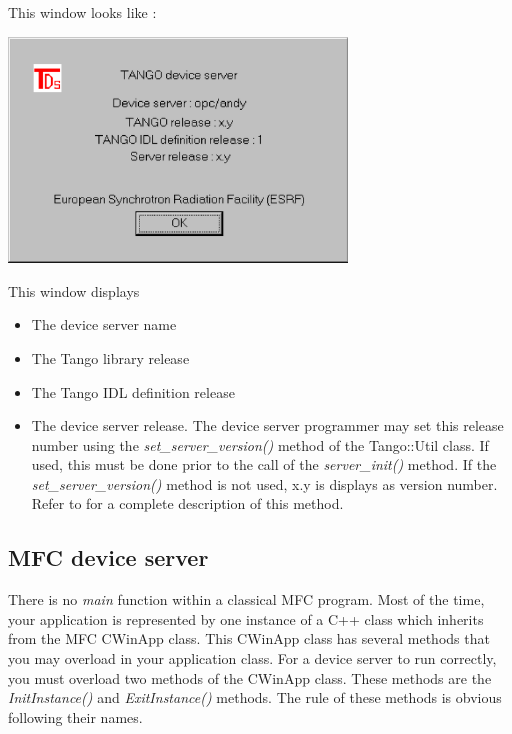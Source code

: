 This window looks like :

\vspace{0.3cm}

\begin{center}
\includegraphics[width=9cm]{ds_writing/nt_server/help}
\par\end{center}

\vspace{0.3cm}

This window displays 
\begin{itemize}
\item The device server name
\item The Tango library release
\item The Tango IDL definition release
\item The device server release. The device server programmer may set this
release number using the \emph{set\_server\_version()}
method of the Tango::Util class. If used, this must be
done prior to the call of the \emph{server\_init()} method. If the
\emph{set\_server\_version()} method is not used, x.y is displays
as version number. Refer to \cite{TANGO_ref_man} for a complete description
of this method.
\end{itemize}

\subsection{MFC device server}

There is no \emph{main} function within a classical MFC
program. Most of the time, your application is represented by one
instance of a C++ class which inherits from the MFC CWinApp class.
This CWinApp class has several methods that you may overload in your
application class. For a device server to run correctly, you must
overload two methods of the CWinApp class. These methods are the \emph{InitInstance()}
and \emph{ExitInstance()} methods. The rule of
these methods is obvious following their names.

